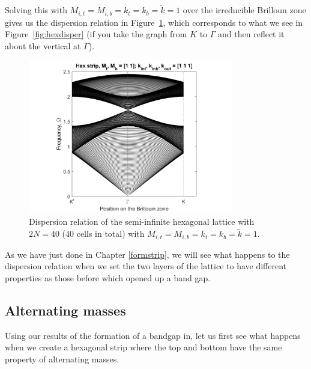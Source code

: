 Solving this with $M_{i,t}=M_{i,b}=k_t=k_b=\tilde{k}=1$ over the irreducible
Brilloun zone gives us the dispersion relation in
Figure~\ref{fig:hexstripdisper}, which corresponds to what we see in
Figure~\ref{fig:hexdisper} (if you take the graph from $K$ to $\Gamma$ and then
reflect it about the vertical at $\Gamma$).

\begin{figure}[!h]
\centering
\includegraphics[width=0.8\textwidth]{imgs/hexstrip.png}
\caption{\label{fig:hexstripdisper} Dispersion relation of the semi-infinite
  hexagonal lattice with $2N=40$ (40 cells in total) with
  $M_{i,t}=M_{i,b}=k_t=k_b=\tilde{k}=1$.}
\end{figure}

As we have just done in Chapter \ref{formstrip}, we will see what happens to
the dispersion relation when we set the two layers of the lattice to have
different properties as those before which opened up a band gap.

\subsection{Alternating masses}
\label{perturbaltmass}
Using our results of the formation of a bandgap in, let us first see what
happens when we create a hexagonal strip where the top and bottom have the same
property of alternating masses. 

